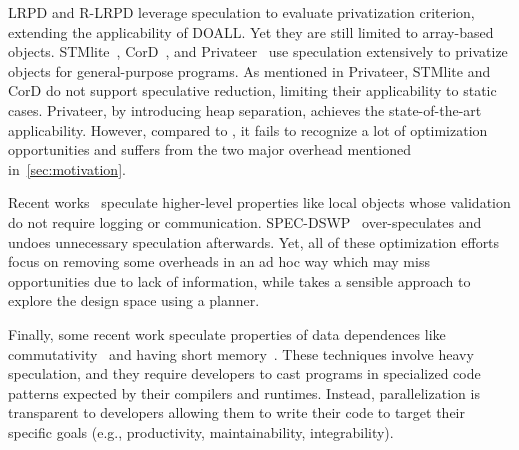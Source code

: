 LRPD\cite{rauchwerger:99:pds} and R-LRPD\cite{dang:02:ipdps} leverage
speculation to evaluate privatization criterion, extending the applicability
of DOALL. Yet they are still limited to array-based objects.
STMlite~\cite{mehrara:09:stmlite}, CorD~\cite{tian:10:pldi}, and
Privateer~\cite{johnson:12:pldi} use speculation extensively to privatize
objects for general-purpose programs. As mentioned in Privateer, STMlite
and CorD do not support speculative reduction, limiting their applicability
to static cases. Privateer, by introducing heap separation, achieves the
state-of-the-art applicability. However, compared to \namensp, it fails to
recognize a lot of optimization opportunities and suffers from the two
major overhead mentioned in~\cref{sec:motivation}.

Recent works~\cite{ctian:2008:micro,johnson:12:pldi,kim:12:cgo} speculate
higher-level properties like local objects whose validation do not
require logging or communication. SPEC-DSWP~\cite{vachharajani:07:pact}
over-speculates and undoes unnecessary speculation afterwards. Yet, all of
these optimization efforts focus on removing some overheads in an ad hoc
way which may miss opportunities due to lack of information, while
\name takes a sensible approach to explore the design space using a
planner.


Finally, some recent work speculate properties of data dependences like
commutativity~\cite{kulkarni:07:pldi,Nguyen:2014:DGO:2541940.2541964} and
having short memory~\cite{Deiana:2018:UPN:3173162.3173181}. These
techniques involve heavy speculation, and they require developers to cast
programs in specialized code patterns expected by their compilers and
runtimes. Instead, \name parallelization is transparent to developers
allowing them to write their code to target their specific goals (e.g.,
productivity, maintainability, integrability).





